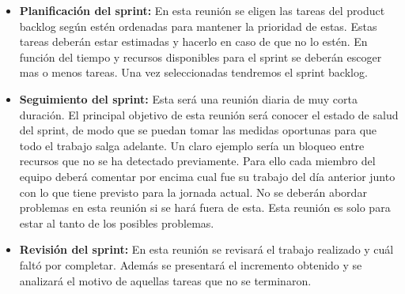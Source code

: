 \begin{itemize}
  \item \textbf{Planificación del sprint:} En esta reunión se eligen las tareas del product
     backlog según estén ordenadas para mantener la prioridad de estas. Estas tareas deberán
     estar estimadas y hacerlo en caso de que no lo estén. En función del tiempo y recursos
     disponibles para el sprint se deberán escoger mas o menos tareas. Una vez seleccionadas
     tendremos el sprint backlog.
  \item \textbf{Seguimiento del sprint:} Esta será una reunión diaria de muy corta duración.
     El principal objetivo de esta reunión será conocer el estado de salud del sprint, de modo
     que se puedan tomar las medidas oportunas para que todo el trabajo salga adelante. Un
     claro ejemplo sería un bloqueo entre recursos que no se ha detectado previamente. Para
     ello cada miembro del equipo deberá comentar por encima cual fue su trabajo del día
     anterior junto con lo que tiene previsto para la jornada actual. No se deberán abordar
     problemas en esta reunión si se hará fuera de esta. Esta reunión es solo para estar al
     tanto de los posibles problemas.
  \item \textbf{Revisión del sprint:} En esta reunión se revisará el trabajo realizado y cuál
     faltó por completar. Además se presentará el incremento obtenido y se analizará el motivo
     de aquellas tareas que no se terminaron.
\end{itemize}
